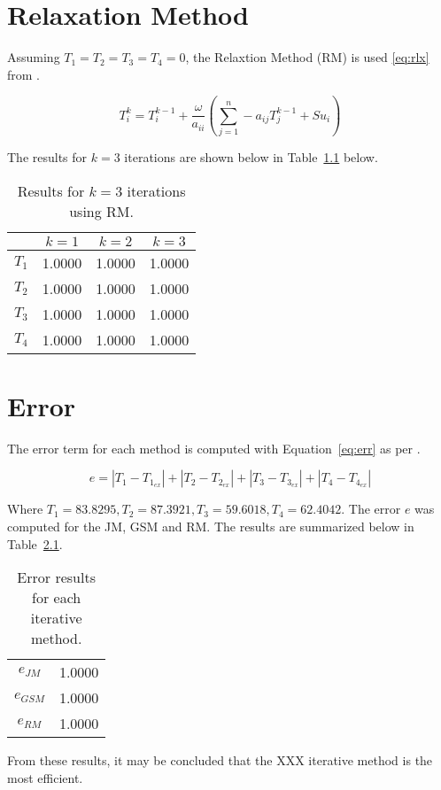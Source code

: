 \chapter{Relaxation Method}
\label{chap:relax}


Assuming $T_1=T_2=T_3=T_4=0$, the Relaxtion Method (RM) is used \ref{eq:rlx} from \cite{cfdbook}.

\begin{equation}
	\label{eq:rlx}	
	T_i^k = T_i^{k-1} + \frac{\omega}{a_{ii}} \left( \sum_{j=1}^{n} - a_{ij} T_j^{k-1} + Su_i \right)
\end{equation}


The results for $k=3$ iterations are shown below in Table~\ref{tab:rm} below.

\begin{table}[H]
  \centering
  \caption{Results for $k=3$ iterations using RM.}
    \begin{tabular}{cccc}
          & $k=1$ & $k=2$ & $k=3$ \\
    \midrule
    $T_1$ & 1.0000 & 1.0000 & 1.0000 \\
    $T_2$ & 1.0000 & 1.0000 & 1.0000 \\
    $T_3$ & 1.0000 & 1.0000 & 1.0000 \\
    $T_4$ & 1.0000 & 1.0000 & 1.0000 \\
    \end{tabular}
  \label{tab:rm}
\end{table}



\chapter{Error}
\label{chap:error}

The error term for each method is computed with Equation~\ref{eq:err} as per \cite{assign}.

\begin{equation}
	\label{eq:err}	
	e = |T_1 - T_{1_{ex}}|+|T_2 - T_{2_{ex}}|+|T_3 - T_{3_{ex}}|+|T_4 - T_{4_{ex}}|
\end{equation}

Where $T_1 = 83.8295, T_2 = 87.3921, T_3 = 59.6018, T_4 = 62.4042$. The error $e$ was computed for the JM, GSM and RM. The results are summarized below in Table~\ref{tab:err}.

\begin{table}[H]
  \centering
  \caption{Error results for each iterative method.}
    \begin{tabular}{c|c}
    $e_{JM}$ 	& 1.0000 \\
    $e_{GSM}$ 	& 1.0000 \\
    $e_{RM}$ 	& 1.0000 \\
    \end{tabular}
  \label{tab:err}
\end{table}

From these results, it may be concluded that the XXX iterative method is the most efficient.


